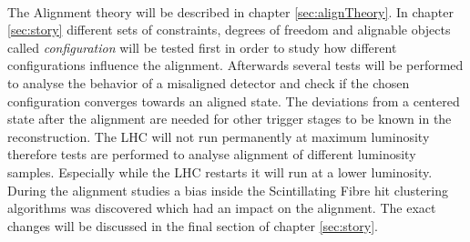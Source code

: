 \\
The Alignment theory will be described in chapter \ref{sec:alignTheory}. In chapter \ref{sec:story} different sets of constraints, degrees of freedom
and alignable objects called \textit{configuration} will be tested first in order
to study how different configurations influence the alignment. Afterwards several
tests will be performed to analyse the behavior of a misaligned detector and check
if the chosen configuration converges towards an aligned state.
The deviations from a centered state after the alignment are needed for other trigger stages to be known in the reconstruction.
The LHC will not run permanently at maximum luminosity therefore tests are performed to analyse alignment of different luminosity samples. Especially while the LHC restarts it will run at a lower luminosity.
During the alignment studies a bias inside the Scintillating Fibre hit clustering algorithms was discovered which had an impact on the alignment. The exact changes will be discussed in the final section of chapter \ref{sec:story}.

